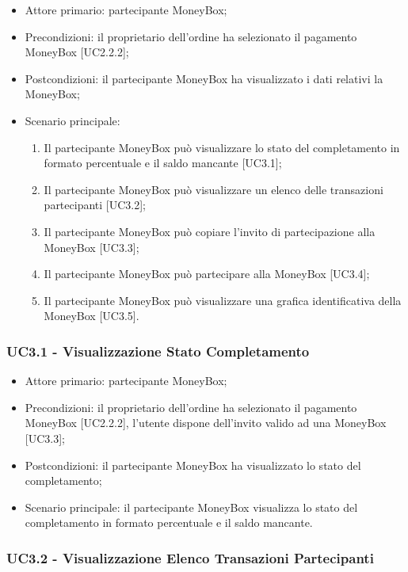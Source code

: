 \begin{itemize}
    \item Attore primario: partecipante MoneyBox\glo{};
    \item Precondizioni: il proprietario dell'ordine ha selezionato il pagamento MoneyBox\glo{} [UC2.2.2];
    \item Postcondizioni: il partecipante MoneyBox\glo{} ha visualizzato i dati relativi la MoneyBox\glo{};
    \item Scenario principale:
        \begin{enumerate}
            \item Il partecipante MoneyBox\glo{} può visualizzare lo stato del completamento in formato percentuale e il saldo mancante [UC3.1];
            \item Il partecipante MoneyBox\glo{} può visualizzare un elenco delle transazioni partecipanti [UC3.2];
            \item Il partecipante MoneyBox\glo{} può copiare l'invito di partecipazione alla MoneyBox\glo{} [UC3.3];
            \item Il partecipante MoneyBox\glo{} può partecipare alla MoneyBox\glo{} [UC3.4];
            \item Il partecipante MoneyBox\glo{} può visualizzare una grafica identificativa della MoneyBox\glo{} [UC3.5].
    \end{enumerate}
\end{itemize}

\subsubsection{UC3.1 - Visualizzazione Stato Completamento}

\begin{itemize}
    \item Attore primario: partecipante MoneyBox\glo{};
    \item Precondizioni: il proprietario dell'ordine ha selezionato il pagamento MoneyBox\glo{} [UC2.2.2], 
            l'utente dispone dell'invito valido ad una MoneyBox\glo{} [UC3.3];
    \item Postcondizioni: il partecipante MoneyBox\glo{} ha visualizzato lo stato del completamento;
    \item Scenario principale: il partecipante MoneyBox\glo{} visualizza lo stato del completamento in formato percentuale e il saldo mancante.
\end{itemize}

\subsubsection{UC3.2 - Visualizzazione Elenco Transazioni Partecipanti}

